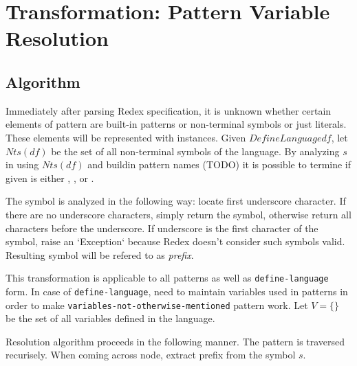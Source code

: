 \section{Transformation: Pattern Variable Resolution}

\subsection{Algorithm}

Immediately after parsing Redex specification, it is unknown whether certain elements of pattern are built-in patterns or non-terminal symbols or just literals. These elements will be represented with \UnresolvedSymbol instances. Given $DefineLanguage df$, let $Nts(df)$ be the set of all non-terminal symbols of the language. By analyzing $s$ in \UnresolvedSymbol using $Nts(df)$ and buildin pattern names (TODO) it is possible to termine if given \UnresolvedSymbol is either \Nt, \BuiltInPattern, or \LiteralPattern.

The symbol is analyzed in the following way: locate first underscore character. If there are no underscore characters, simply return the symbol, otherwise return all characters before the underscore. If underscore is the first character of the symbol, raise an `Exception` because Redex doesn't consider such symbols valid. Resulting symbol will be refered to as \textit{prefix}.

This transformation is applicable to all patterns as well as \texttt{define-language} form. In case of \texttt{define-language}, need to maintain variables used in patterns in order to make \texttt{variables-not-otherwise-mentioned} pattern work. Let $V = \{\}$ be the set of all variables defined in the language. 

Resolution algorithm proceeds in the following manner. The pattern is traversed recurisely. When coming across \UnresolvedSymbol node, extract prefix from the symbol $s$.  


